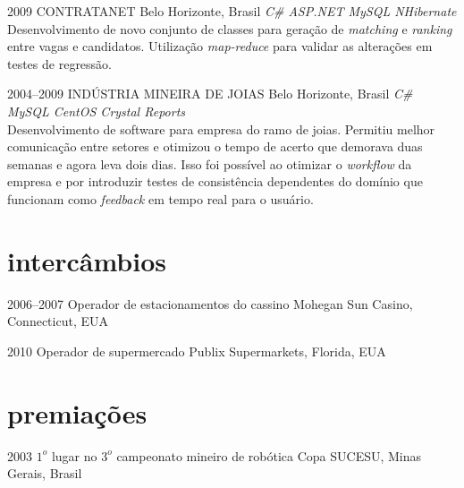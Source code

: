 \documentclass[]{friggeri-cv}
\begin{document}
\begin{entrylist}
{}



\entry
{2009}
{CONTRATANET}
{Belo Horizonte, Brasil}
{\emph{\bullet C\# \bullet ASP.NET \bullet MySQL \bullet NHibernate } \\ Desenvolvimento de novo conjunto de classes para geração de \textit{matching} e \textit{ranking} entre vagas e candidatos. Utilização \textit{map-reduce} para validar as alterações em testes de regressão. }


%
 \entry
 {2004--2009}
 {INDÚSTRIA MINEIRA DE JOIAS}
 {Belo Horizonte, Brasil}
 {\emph{\bullet C\# \bullet MySQL \bullet CentOS \bullet Crystal Reports } \\ Desenvolvimento de software para empresa do ramo de joias. Permitiu melhor comunicação entre setores e otimizou o tempo de acerto que demorava duas semanas e agora leva dois dias. Isso foi possível ao otimizar o \textit{workflow} da empresa e por introduzir testes de consistência dependentes do domínio que funcionam como \textit{feedback} em tempo real para o usuário.}
%

\end{entrylist}



\section{intercâmbios} 

\begin{entrylist}

\entry
{2006--2007}
{Operador {\normalfont de estacionamentos do cassino}}
{Mohegan Sun Casino, Connecticut, EUA}

\entry
{2010} 
{Operador {\normalfont de supermercado}}
{Publix Supermarkets, Florida, EUA}

\end{entrylist}


\section{premiações}



\begin{entrylist}

\entry
{2003} 
{$1^{o}$ lugar {\normalfont no $3^{o}$ campeonato mineiro de robótica}}
{Copa SUCESU, Minas Gerais, Brasil}


\end{entrylist}
\end{document}
